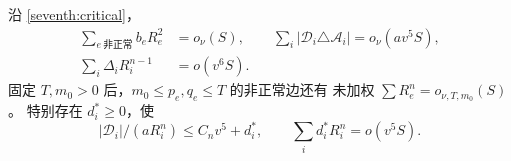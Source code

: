 \begin{lemma}[横权与全横向成本的稳定性]\label{seventh:profile}
沿 \eqref{seventh:critical}，
\begin{align}
 \sum_{e\ \text{非正常}}b_eR_e^2&=o_\nu(S),\qquad
 \sum_i|\mathscr D_i\triangle\mathcal A_i|=o_\nu(av^5S),
 \label{seventh:profile-conclusion}\\
 \sum_i\Delta_iR_i^{n-1}&=o(v^6S).
 \label{seventh:end-small}
\end{align}
固定 \(T,m_0>0\) 后，\(m_0\le p_e,q_e\le T\) 的非正常边还有
未加权 \(\sum R_e^n=o_{\nu,T,m_0}(S)\)。
特别存在 \(d_i^*\ge0\)，使
\begin{equation}\label{seventh:deficit-tail}
 |\mathscr D_i|/(aR_i^n)\le C_nv^5+d_i^*,\qquad
 \sum_i d_i^*R_i^n=o(v^5S).
\end{equation}
\end{lemma}
